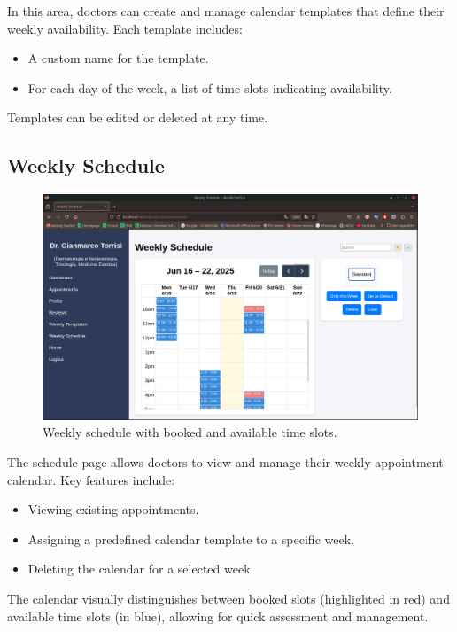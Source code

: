 In this area, doctors can create and manage calendar templates that define their weekly availability. Each template includes:
\begin{itemize}
    \item A custom name for the template.
    \item For each day of the week, a list of time slots indicating availability.
\end{itemize}
Templates can be edited or deleted at any time.

\subsection{Weekly Schedule}

\begin{figure}[!h]
    \centering
    \includegraphics[scale=0.30]{resources/screenshots/doctor_ui/schedule.png}
    \caption{Weekly schedule with booked and available time slots.}
    \label{fig:weekly_schedule}
\end{figure}

The schedule page allows doctors to view and manage their weekly appointment calendar. Key features include:
\begin{itemize}
    \item Viewing existing appointments.
    \item Assigning a predefined calendar template to a specific week.
    \item Deleting the calendar for a selected week.
\end{itemize}

The calendar visually distinguishes between booked slots (highlighted in red) and available time slots (in blue), allowing for quick assessment and management.
